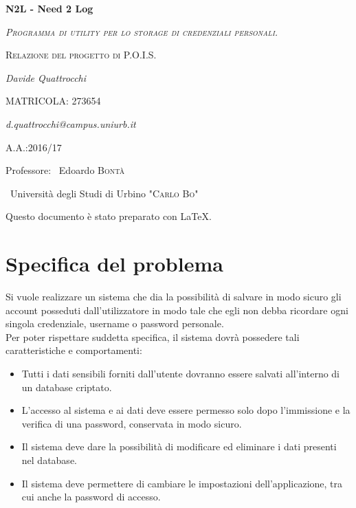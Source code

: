 \documentclass[a4paper,10pt]{report}
\begin{document}
\begin{titlepage}
	\centering
	\vfill
	{\huge\bfseries N2L - Need 2 Log\par}
  \vspace{1cm}
  {\scshape\large\itshape Programma di utility per lo storage di credenziali personali.\par}
	\vspace{0.5cm}
  {\scshape\large Relazione del progetto di P.O.I.S.\par}
	\vspace{2cm}
	{\Large\itshape Davide Quattrocchi\par}
  {\large MATRICOLA: 273654\par}
	{\itshape d.quattrocchi@campus.uniurb.it\par}
	\vfill
  {\large A.A.:2016/17\par}
	\vspace{0.2cm}
	Professore: ~Edoardo \textsc{Bontà}\par
	\vspace{1.0cm}
	~Università degli Studi di Urbino \textsc{"Carlo Bo"}\par
	\vfill
  \vspace{0.5cm}
  Questo documento è stato preparato con \LaTeX.
  \end{titlepage}
\newpage
\tableofcontents
\newpage
\lstlistoflistings
\newpage
\chapter{Specifica del problema}
		Si vuole realizzare un sistema che dia la possibilità di salvare in modo
			sicuro gli account posseduti dall'utilizzatore in modo tale che egli non
			debba ricordare	ogni singola credenziale, username o password personale.\\
		Per poter rispettare suddetta specifica, il sistema dovrà possedere tali
		 	caratteristiche e comportamenti:
		\begin{itemize}
			\item Tutti i dati sensibili forniti dall'utente dovranno essere salvati
				all'interno di un database criptato.
			\item L'accesso al sistema e ai dati deve essere permesso solo dopo
				l'immissione e la verifica di una password, conservata in modo sicuro.
			\item Il sistema deve dare la possibilità di modificare ed eliminare
				i dati presenti nel database.
			\item Il sistema deve permettere di cambiare le impostazioni dell'applicazione,
				tra cui anche la password di accesso.
			\end{itemize}
\newpage
\end{document}
